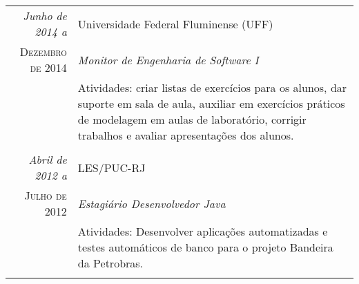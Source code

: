 \documentclass[a4paper,10pt]{article}
\begin{document}
\begin{tabular}{r|p{10cm}}
 \emph{Junho de 2014 a} & Universidade Federal Fluminense (UFF) \\
 \textsc{Dezembro de 2014}&\emph{Monitor de Engenharia de Software I}\\
 &\footnotesize{Atividades: criar listas de exercícios para os alunos, dar suporte em sala de aula, auxiliar em exercícios práticos de modelagem em aulas de laboratório, corrigir trabalhos e avaliar apresentações dos alunos.}\\
 
  & \\
 
 \emph{Abril de 2012 a} & LES/PUC-RJ \\
 \textsc{Julho de 2012}&\emph{Estagiário Desenvolvedor Java}\\
 &\footnotesize{Atividades: Desenvolver aplicações automatizadas e testes automáticos de banco para o projeto Bandeira da Petrobras.}\\
 
 \multicolumn{2}{c}{} \end{tabular}
 
\end{document}
